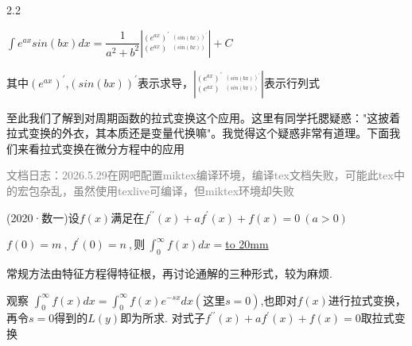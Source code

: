 \documentclass[12pt]{report}
\begin{document}
  \vspace{-7pt}
  
  \begin{spacing}{2.2}
  	 \begin{center}
  		$\int e^{ax}sin\left(bx\right)dx=\dfrac{1}{a^{2}+b^{2}}\left|_{\left(e^{ax}\right)}^{\left(e^{ax}\right)^{\prime}}\:_{^{\left(sin\left(bx\right)\right)}}^{^{\left(sin\left(bx\right)\right)^{\prime}}}\right|+C$ 
  		
  		其中$\left(e^{ax}\right)^{\prime}$,$\left(sin\left(bx\right)\right)^{\prime}$表示求导，$\left|_{\left(e^{ax}\right)}^{\left(e^{ax}\right)^{\prime}}\:_{^{\left(sin\left(bx\right)\right)}}^{^{\left(sin\left(bx\right)\right)^{\prime}}}\right|$表示行列式
  	\end{center}
  \end{spacing}
 
  至此我们了解到对周期函数的拉式变换这个应用。这里有同学托腮疑惑："这披着拉式变换的外衣，其本质还是变量代换嘛"。我觉得这个疑惑非常有道理。下面我们来看拉式变换在微分方程中的应用
  
  \textcolor{gray}{文档日志：2026.5.29在网吧配置miktex编译环境，编译tex文档失败，可能此tex中的宏包杂乱，虽然使用texlive可编译，但miktex环境却失败}
  
  \clearpage
  
   (2020·数一)设$f(x)$满足在$f^{\prime\prime}\left(x\right)+af^{\prime}\left(x\right)+f\left(x\right)=0\:\left(a>0\right)$
  
  \hspace{3em}$f\left(0\right)=m\:,\:f^{\prime}\left(0\right)=n\:,则\:\int_{0}^{\infty}f\left(x\right)dx=$\underline{\hbox to 20mm{}}
   
   \vspace{10pt}
   
    常规方法由特征方程得特征根，再讨论通解的三种形式，较为麻烦.
   
   观察 $\int_{0}^{\infty}f\left(x\right)dx=\int_{0}^{\infty}f\left(x\right)e^{-sx}dx (这里s=0)$,也即对$f(x)$进行拉式变换，再令$s=0$得到的$L(y)$即为所求. 对式子$f^{\prime\prime}\left(x\right)+af^{\prime}\left(x\right)+f\left(x\right)=0$取拉式变换
   
   \vspace{-10pt}
   
\end{document}
